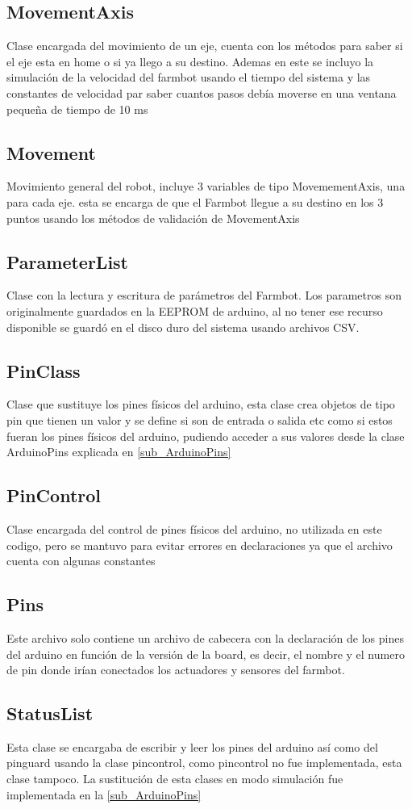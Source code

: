 \documentclass[letterpaper,12pt]{article}
\begin{document}
	\subsection{MovementAxis}
	Clase encargada del movimiento de un eje, cuenta con los métodos para saber si el eje esta en home o si ya llego a su destino. Ademas en este se incluyo la simulación de la velocidad del farmbot usando el tiempo del sistema y las constantes de velocidad par saber cuantos pasos debía moverse en una ventana pequeña de tiempo de 10 ms
	\subsection{Movement}
	Movimiento general del robot, incluye 3 variables de tipo MovemementAxis, una para cada eje. esta se encarga de que el Farmbot llegue a su destino en los 3 puntos usando los métodos de validación de MovementAxis
	\subsection{ParameterList}
	Clase con la lectura y escritura de parámetros del Farmbot. Los parametros son originalmente guardados en la EEPROM de arduino, al no tener ese recurso disponible se guardó en el disco duro del sistema usando archivos CSV.
	\subsection{PinClass}
	Clase que sustituye los pines físicos del arduino, esta clase crea objetos de tipo pin que tienen un valor y se define si son de entrada o salida etc como si estos fueran los pines físicos del arduino, pudiendo acceder a sus valores desde la clase ArduinoPins explicada en \ref{sub_ArduinoPins}
	\subsection{PinControl}
	Clase encargada del control de pines físicos del arduino, no utilizada en este codigo, pero se mantuvo para evitar errores en declaraciones ya que el archivo cuenta con algunas constantes
	\subsection{Pins}
		Este archivo solo contiene un archivo de cabecera con la declaración de los pines del arduino en función de la versión de la board, es decir, el nombre y el numero de pin donde irían conectados los actuadores y sensores del farmbot.
	\subsection{StatusList}
	Esta clase se encargaba de escribir y leer los pines del arduino así como del pinguard usando la clase pincontrol, como pincontrol no fue implementada, esta clase tampoco. La sustitución de esta clases en modo simulación fue implementada en la \ref{sub_ArduinoPins}
\end{document}
